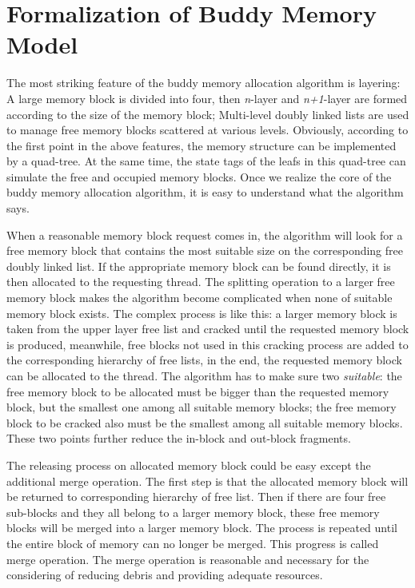 \documentclass[runningheads]{llncs}
\begin{document}
\section{Formalization of Buddy Memory Model}
The most striking feature of the buddy memory allocation algorithm is layering: A large memory block is divided into four, then \textsl{n}-layer and \textsl{n+1}-layer are formed according to the size of the memory block; Multi-level doubly linked lists are used to manage free memory blocks scattered at various levels. Obviously, according to the first point in the above features, the memory structure can be implemented by a quad-tree. At the same time, the state tags of the leafs in this quad-tree can simulate the free and occupied memory blocks. Once we realize the core of the buddy memory allocation algorithm, it is easy to understand what the algorithm says.

When a reasonable memory block request comes in, the algorithm will look for a free memory block that contains the most suitable size on the corresponding free doubly linked list. If the
appropriate memory block can be found directly, it is then allocated to the requesting thread. The splitting operation to a larger free memory block makes the algorithm become complicated when none of suitable memory block exists. The complex process is like this: a larger memory block is taken from the upper layer free list and cracked until the requested memory block is produced, meanwhile, free blocks not used in this cracking process are added to the corresponding hierarchy of free lists, in the end, the requested memory block can be allocated to the thread. The algorithm has to make sure two \textsl{suitable}: the free memory block to be allocated must be bigger than the requested memory block, but the smallest one among all suitable memory blocks; the free memory block to be cracked also must be the smallest among all suitable memory blocks. These two points further reduce the in-block and out-block fragments.

The releasing process on allocated memory block could be easy except the additional merge operation. The first step is that the allocated memory block will be returned to corresponding hierarchy of free list. Then if there are four free sub-blocks and they all belong to a larger memory block, these free memory blocks will be merged into a larger memory block. The process is repeated until the entire block of memory can no longer be merged. This progress is called merge operation. The merge operation is reasonable and necessary for the considering of reducing debris and providing adequate resources.
\end{document}
